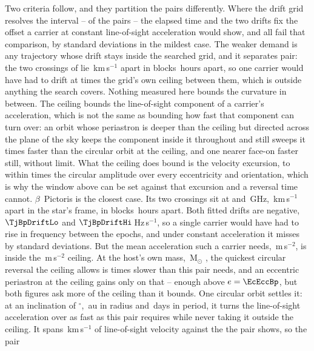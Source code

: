 Two criteria follow, and they partition the pairs differently. Where the drift
grid resolves the interval -- \TjNPower{} of the \TjNPair{} pairs -- the
elapsed time and the two drifts fix the offset a carrier at constant
line-of-sight acceleration would show, and all \TjNPower{} fail that
comparison, by \TjSigMin{} standard deviations in the mildest case. The weaker
demand is any trajectory whose drift stays inside the searched grid, and it
separates \TjNExcl{} pair: the two crossings of \EcGridStar{} lie
\EcGridDvKms\,km\,s$^{-1}$ apart in blocks \EcGridDtH\,hours apart, so one
carrier would have had to drift at \EcGridFactor{} times the grid's own
ceiling between them, which is outside anything the search covers. Nothing
measured here bounds the curvature in between. The ceiling bounds the
line-of-sight component of a carrier's acceleration, which is not the same as
bounding how fast that component can turn over: an orbit whose periastron is
deeper than the ceiling but directed across the plane of the sky keeps the
component inside it throughout and still sweeps it \EcRateSupFac{} times
faster than the circular orbit at the ceiling, and one nearer face-on faster
still, without limit. What the ceiling does bound is the velocity
excursion, to within \EcVsupFac{} times the circular amplitude over every
eccentricity and orientation, which is why the window above can be set against
that excursion and a reversal time cannot.
$\beta$~Pictoris is the closest case. Its two crossings sit at \TjBpNuLo{}
and \TjBpNuHi\,GHz, \TjBpDvKms\,km\,s$^{-1}$ apart in the star's frame, in
blocks \TjBpDtH\,hours apart. Both fitted drifts are negative,
$\TjBpDriftLo$ and $\TjBpDriftHi$\,Hz\,s$^{-1}$, so a single carrier would
have had to rise in frequency between the epochs, and under constant
acceleration it misses by \TjBpNSig{} standard deviations. But the mean
acceleration such a carrier needs, \TjBpAccelReq\,m\,s$^{-2}$, is inside the
\WdAGrid\,m\,s$^{-2}$ ceiling. At
the host's own mass, \EcMassBp\,M$_\odot$ \citep{Crifo1997}, the quickest
circular reversal the ceiling allows is \EcMarginBp{} times slower than this
pair needs, and an eccentric periastron at the ceiling gains only
\EcEccFac{} on that -- enough above $e=\EcEccBp$, but both figures ask more
of the ceiling than it bounds. One circular orbit settles it: at an inclination of \EcWitIncBp$^\circ$,
\EcWitAuBp\,au in radius and \EcWitDayBp\,days in period, it turns the
line-of-sight acceleration over as fast as this pair requires while never
taking it outside the ceiling. It spans \EcWitSpanBp\,km\,s$^{-1}$ of
line-of-sight velocity against the \TjBpDvKms{} the pair shows, so the pair
